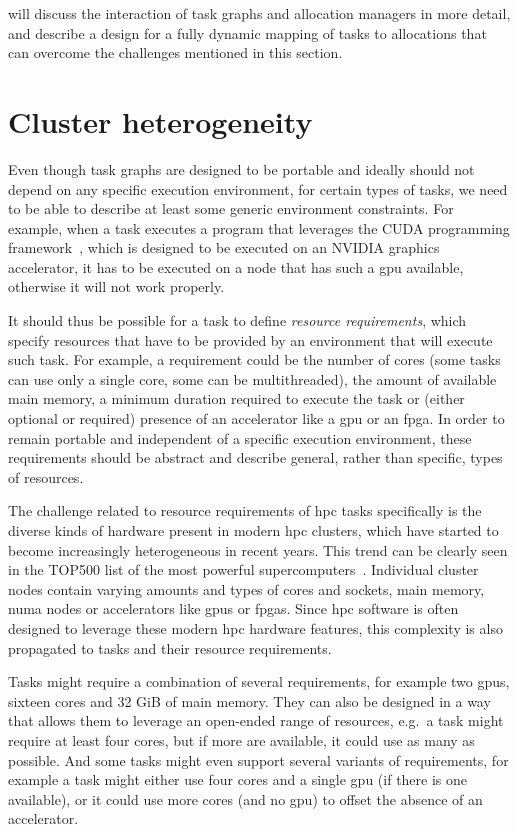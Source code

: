  will discuss the interaction of task graphs and allocation managers in
more detail, and describe a design for a fully dynamic mapping of tasks to allocations that can
overcome the challenges mentioned in this section.

\section{Cluster heterogeneity}
Even though task graphs are designed to be portable and ideally should not depend on any specific
execution environment, for certain types of tasks, we need to be able to describe at least some
generic environment constraints. For example, when a task executes a program that leverages the
CUDA programming framework~\cite{cuda}, which is designed to be executed on an
NVIDIA graphics accelerator, it has to be executed on a node that has such a
\gls{gpu} available, otherwise it will not work properly.

It should thus be possible for a task to define \emph{resource requirements}, which specify resources
that have to be provided by an environment that will execute such task. For example, a requirement
could be the number of cores (some tasks can use only a single core, some can be multithreaded),
the amount of available main memory, a minimum duration required to execute the task or (either
optional or required) presence of an accelerator like a \gls{gpu} or an
\gls{fpga}. In order to remain portable and independent of a specific execution
environment, these requirements should be abstract and describe general, rather than specific,
types of resources.

The challenge related to resource requirements of \gls{hpc} tasks specifically is
the diverse kinds of hardware present in modern \gls{hpc} clusters, which have
started to become increasingly heterogeneous in recent years. This trend can be clearly seen in the
TOP500 list of the most powerful supercomputers~\cite{top500analysis}. Individual cluster
nodes contain varying amounts and types of cores and sockets, main memory,
\gls{numa} nodes or accelerators like \glspl{gpu} or
\glspl{fpga}. Since \gls{hpc} software is often designed to
leverage these modern \gls{hpc} hardware features, this complexity is also
propagated to tasks and their resource requirements.

Tasks might require a combination of several requirements, for example two
\glspl{gpu}, sixteen cores and 32 GiB of main memory. They can also be designed in
a way that allows them to leverage an open-ended range of resources, e.g.\ a task might require at
least four cores, but if more are available, it could use as many as possible. And some tasks might
even support several variants of requirements, for example a task might either use four cores and a
single \gls{gpu} (if there is one available), or it could use more cores (and no \gls{gpu})
to offset the absence of an accelerator.

